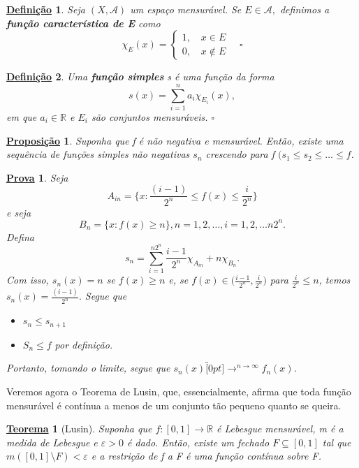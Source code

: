 \documentclass{article}
\newtheorem*{def*}{\underline{Defini\c c\~ao}}
\newtheorem*{theorem*}{\underline{Teorema}}
\newtheorem*{prop*}{\underline{Proposi\c c\~ao}}
\newtheorem*{proof*}{\underline{Prova}}
\begin{document}
\begin{def*}
  Seja \((X, \mathcal{A})\) um espaço mensurável. Se \(E\in \mathcal{A},\) definimos a \textbf{função característica de E} como 
    \[
      \chi_{E}(x)  = \left\{\begin{array}{ll}
          1,\quad x\in E \\ 
          0,\quad x\not\in E
        \end{array}\right.\quad \square
    \]
\end{def*}
\begin{def*}
  Uma \textbf{função simples} s é uma função da forma 
    \[
      s(x) = \sum\limits_{i=1}^{n}a_{i}\chi_{E_{i}}(x),
    \]
  em que \(a_{i}\in \mathbb{R}\) e \(E_{i}\) são conjuntos mensuráveis. \(\square\)
\end{def*}
\begin{prop*}
  Suponha que f é não negativa e mensurável. Então, existe uma sequência de funções simples não negativas \(s_{n}\) crescendo para f \((s_1\leq s_2\leq \dotsc \leq f\).
\end{prop*}
\begin{proof*}
  Seja 
    \[
      A_{in} = \biggl\{x: \frac{(i-1)}{2^{n}} \leq f(x) \leq \frac{i}{2^{n}}\biggr\}
    \]
  e seja 
    \[
      B_{n} = \{x: f(x) \geq n\}, n =1, 2,\dotsc , i = 1, 2, \dotsc n2^{n}.
    \]
  Defina 
    \[
      s_{n} = \sum\limits_{i=1}^{n2^{n}}\frac{i-1}{2^{n}}\chi_{A_{in}} + n\chi_{B_{n}}.
    \]
  Com isso, \(s_{n}(x) = n \) se \(f(x)\geq n\) e, se \(f(x)\in \biggl(\frac{i-1}{2^{n}}, \frac{i}{2^{n}}\biggr)\) para \(\frac{i}{2^{n}} \leq n\), temos \(s_{n}(x) = \frac{(i-1)}{2^{n}}.\) Segue que 
 \begin{itemize}
   \item \(s_{n} \leq s_{n+1}\)
   \item \(S_{n} \leq f\) por definição.
 \end{itemize}
 Portanto, tomando o limite, segue que \(s_{n}(x)\overbracket[0pt]{\longrightarrow}^{n\to \infty}f_{n}(x)\).
\end{proof*}
Veremos agora o Teorema de Lusin, que, essencialmente, afirma que toda função mensurável é 
contínua a menos de um conjunto tão pequeno quanto se queira.
\begin{theorem*}[Lusin]
  Suponha que \(f:[0, 1]\rightarrow \mathbb{R}\) é Lebesgue mensurável, m é a medida de Lebesgue e \(\varepsilon > 0\) é dado. Então, existe um fechado \(F\subseteq [0, 1]\) tal que 
  \(m([0, 1]\setminus{F}) < \varepsilon \) e a restrição de f a F é uma função contínua sobre F.
\end{theorem*}
\end{document}
